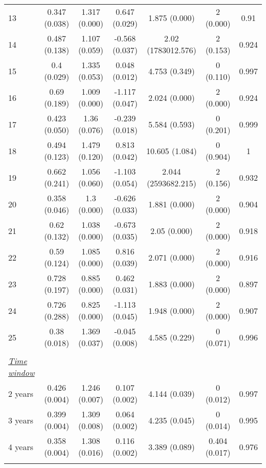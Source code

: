\begin{tabular}{@{\extracolsep{5pt}} l cccccc}
13 & 0.347 (0.038) & 1.317 (0.000) & 0.647 (0.029) & 1.875 (0.000) & 2 (0.000) & 0.91 \\ 
14 & 0.487 (0.138) & 1.107 (0.059) & -0.568 (0.037) & 2.02 (1783012.576) & 2 (0.153) & 0.924 \\ 
15 & 0.4 (0.029) & 1.335 (0.053) & 0.048 (0.012) & 4.753 (0.349) & 0 (0.110) & 0.997 \\ 
16 & 0.69 (0.189) & 1.009 (0.000) & -1.117 (0.047) & 2.024 (0.000) & 2 (0.000) & 0.924 \\ 
17 & 0.423 (0.050) & 1.36 (0.076) & -0.239 (0.018) & 5.584 (0.593) & 0 (0.201) & 0.999 \\ 
18 & 0.494 (0.123) & 1.479 (0.120) & 0.813 (0.042) & 10.605 (1.084) & 0 (0.904) & 1 \\ 
19 & 0.662 (0.241) & 1.056 (0.060) & -1.103 (0.054) & 2.044 (2593682.215) & 2 (0.156) & 0.932 \\ 
20 & 0.358 (0.046) & 1.3 (0.000) & -0.626 (0.033) & 1.881 (0.000) & 2 (0.000) & 0.904 \\ 
21 & 0.62 (0.132) & 1.038 (0.000) & -0.673 (0.035) & 2.05 (0.000) & 2 (0.000) & 0.918 \\ 
22 & 0.59 (0.124) & 1.085 (0.000) & 0.816 (0.039) & 2.071 (0.000) & 2 (0.000) & 0.916 \\ 
23 & 0.728 (0.197) & 0.885 (0.000) & 0.462 (0.031) & 1.883 (0.000) & 2 (0.000) & 0.897 \\ 
24 & 0.726 (0.288) & 0.825 (0.000) & -1.113 (0.045) & 1.948 (0.000) & 2 (0.000) & 0.907 \\ 
25 & 0.38 (0.018) & 1.369 (0.037) & -0.045 (0.008) & 4.585 (0.229) & 0 (0.071) & 0.996 \\ 
 &   &   &   &   &   &  \\ 
\underline{{\it Time window}} &   &   &   &   &   &  \\ 
2 years & 0.426 (0.004) & 1.246 (0.007) & 0.107 (0.002) & 4.144 (0.039) & 0 (0.012) & 0.997 \\ 
3 years & 0.399 (0.004) & 1.309 (0.008) & 0.064 (0.002) & 4.235 (0.045) & 0 (0.014) & 0.995 \\ 
4 years & 0.358 (0.004) & 1.308 (0.016) & 0.116 (0.002) & 3.389 (0.089) & 0.404 (0.017) & 0.976 \\ 
\hline \\[-1.8ex] 
\end{tabular} 
